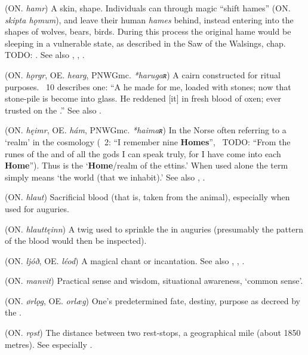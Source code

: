 \begin{itemize}
 (ON. \emph{hamr})
  A skin, shape. Individuals can through magic “shift hames” (ON. \emph{skipta hǫmum}), and leave their human \emph{hames} behind, instead entering into the shapes of wolves, bears, birds. During this process the original hame would be sleeping in a vulnerable state, as described in the Saw of the Walsings, chap. TODO: . See also , , .

 (ON. \emph{hǫrgr}, OE. \emph{hearg}, PNWGmc. \emph{*harugaʀ})
  A cairn constructed for ritual purposes. \Hyndluljod\ 10 describes one: “A  he made for me, loaded with stones; now that stone-pile is become into glass. He reddened [it] in fresh blood of oxen;  ever trusted on the .” See also .

 (ON. \emph{hęimr}, OE. \emph{hám}, PNWGmc. \emph{*haimaʀ})
  In the Norse often referring to a ‘realm’ in the cosmology (\Voluspa\ 2: “I remember nine \textbf{Homes}”, \Vafthrudnismal\ TODO: “From the runes of the  and of all the gods I can speak truly, for I have come into each \textbf{Home}”). Thus  is the ‘\textbf{Home}/realm of the ettins.’ When used alone the term simply means ‘the world (that we inhabit).’ See also , .

 (ON. \emph{hlaut})
  Sacrificial blood (that is, taken from the animal), especially when used for auguries.

 (ON. \emph{hlauttęinn})
  A twig used to sprinkle the  in auguries (presumably the pattern of the blood would then be inspected).

 (ON. \emph{ljóð}, OE. \emph{léod})
  A magical chant or incantation. See also , , .

 (ON. \emph{manvit})
  Practical sense and wisdom, situational awareness, ‘common sense’.

 (ON. \emph{ørlǫg}, OE. \emph{orlæg})
  One’s predetermined fate, destiny, purpose as decreed by the .

 (ON. \emph{rǫst})
  The distance between two rest-stops, a geographical mile (about 1850 metres). See especially \CV.


\end{itemize}

